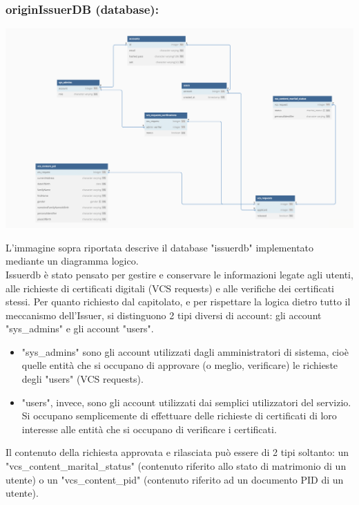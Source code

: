 \subsubsection{originIssuerDB (database):}
    \begin{center}
        \includegraphics[scale = 0.2]{./res/img/issuerdb.png}
      \end{center}
    L'immagine sopra riportata descrive il database "issuerdb" implementato mediante un diagramma logico.\\
    Issuerdb è stato pensato per gestire e conservare le informazioni legate agli utenti, alle richieste di certificati digitali (VCS requests) e alle verifiche dei certificati stessi.
    Per quanto richiesto dal capitolato, e per rispettare la logica dietro tutto il meccanismo dell'Issuer, si distinguono 2 tipi diversi di account: gli account "sys\_admins" e gli account "users".\\
    \begin{itemize}
    \item "sys\_admins" sono gli account utilizzati dagli amministratori di sistema, cioè quelle entità che si occupano di approvare (o meglio, verificare) le richieste degli "users" (VCS requests).\\
    \item "users", invece, sono gli account utilizzati dai semplici utilizzatori del servizio. Si occupano semplicemente di effettuare delle richieste di certificati di loro interesse alle entità che si occupano di verificare i certificati.\\
    \end{itemize}
    Il contenuto della richiesta approvata e rilasciata può essere di 2 tipi soltanto: un "vcs\_content\_marital\_status" (contenuto riferito allo stato di matrimonio di un utente) o un "vcs\_content\_pid" (contenuto riferito ad un documento PID di un utente).\\

